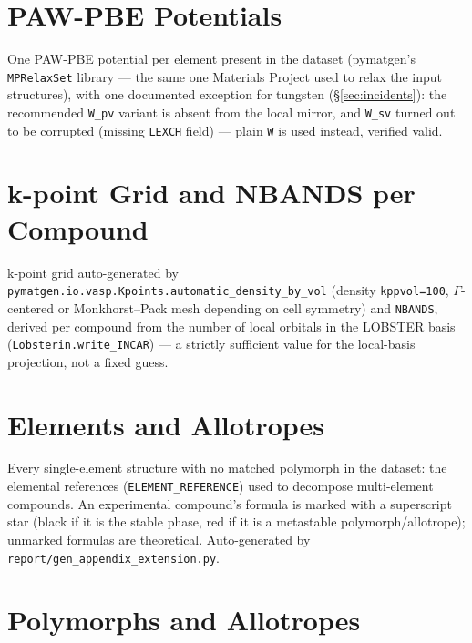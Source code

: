 \documentclass[11pt,a4paper]{article}
\begin{document}
\section{PAW-PBE Potentials}

One PAW-PBE potential per element present in the dataset (pymatgen's
\texttt{MPRelaxSet} library --- the same one Materials Project used to
relax the input structures), with one documented exception for tungsten
(\S\ref{sec:incidents}): the recommended \texttt{W\_pv} variant is absent from the local
mirror, and \texttt{W\_sv} turned out to be corrupted (missing
\texttt{LEXCH} field) --- plain \texttt{W} is used instead, verified
valid.

{\small

}

\section{k-point Grid and NBANDS per Compound}
\label{sec:appendix-kpoints}

k-point grid auto-generated by
\texttt{pymatgen.io.vasp.Kpoints.automatic\_density\_by\_vol} (density
\texttt{kppvol=100}, $\Gamma$-centered or Monkhorst--Pack mesh depending
on cell symmetry) and \texttt{NBANDS}, derived per compound from the
number of local orbitals in the LOBSTER basis
(\texttt{Lobsterin.write\_INCAR}) --- a strictly sufficient value for the
local-basis projection, not a fixed guess.

{\small

}

\section{Elements and Allotropes}
\label{sec:appendix-ext-elements}

Every single-element structure with no matched polymorph in the
dataset: the elemental references (\texttt{ELEMENT\_REFERENCE}) used to
decompose multi-element compounds. An experimental compound's formula is
marked with a superscript star (black if it is the stable phase, red if
it is a metastable polymorph/allotrope); unmarked formulas are
theoretical. Auto-generated by \texttt{report/gen\_appendix\_extension.py}.

{\small

}

\section{Polymorphs and Allotropes}
\label{sec:appendix-ext-polymorphs}
\end{document}
